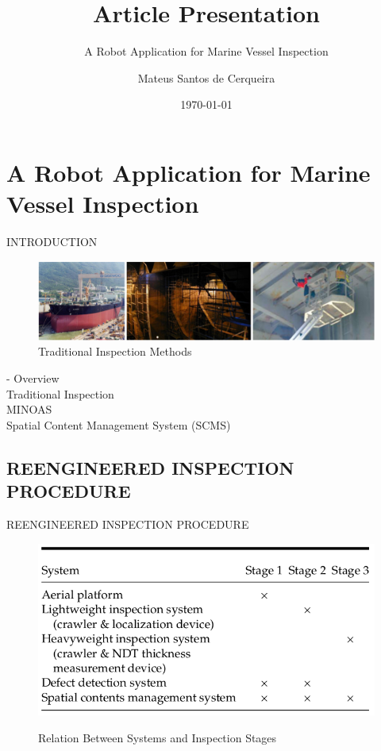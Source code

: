 \documentclass{beamer}
\title{Article Presentation}
\subtitle{A Robot Application for Marine Vessel Inspection}
\author{Mateus Santos de Cerqueira}
\institute{SENAI}
\date{\today}
\begin{document}
    \begin{frame}
        \titlepage
    \end{frame}
    
    \section{A Robot Application for Marine Vessel Inspection}
      
            \begin{frame}{INTRODUCTION}
                \begin{figure}[htb]
                    \centering
                    \includegraphics[scale=0.16]{figuras/traditional_inspection.png}                   
                    \caption{Traditional Inspection Methods}
                    \label{}                    
                \end{figure}
                    - Overview \\
                    Traditional Inspection \\
                    MINOAS \\
                    Spatial Content Management System (SCMS)                
                           
            \end{frame}
            
        \subsection{REENGINEERED INSPECTION PROCEDURE}

            \begin{frame}{REENGINEERED INSPECTION PROCEDURE}
                \begin{figure}[htb]
                    \centering
                    \includegraphics[scale=0.35]{figuras/inspection_stages}                   
                    \label{}
                    \caption{Relation Between Systems and Inspection Stages}
                \end{figure}


            \end{frame}
\end{document}
